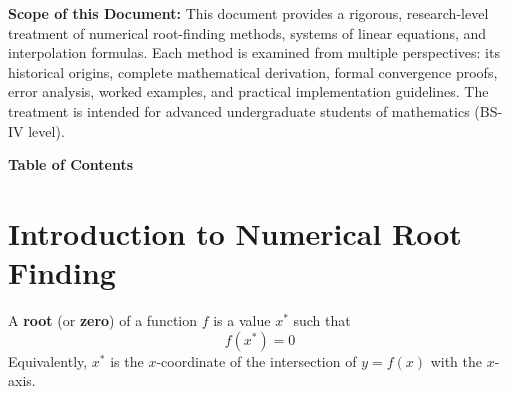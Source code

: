 \documentclass[12pt]{article}
\begin{document}
\vspace{10pt}

\begin{tcolorbox}[colback=purplebg!60, colframe=purpleclr, arc=4pt, boxrule=1pt,
  left=12pt, right=12pt, top=8pt, bottom=8pt,
  borderline west={4pt}{0pt}{purpleclr}]
\textbf{\color{purpleclr}Scope of this Document:} This document provides a rigorous, research-level treatment of numerical root-finding methods, systems of linear equations, and interpolation formulas. Each method is examined from multiple perspectives: its historical origins, complete mathematical derivation, formal convergence proofs, error analysis, worked examples, and practical implementation guidelines. The treatment is intended for advanced undergraduate students of mathematics (BS-IV level).
\end{tcolorbox}

\newpage

\thispagestyle{fancy}

\begin{tcolorbox}[
  enhanced, arc=0pt, boxrule=0pt,
  colback=primary, colframe=primary,
  left=20pt, right=20pt, top=22pt, bottom=18pt,
  borderline south={5pt}{0pt}{accent},
]
  \centering
  {\fontsize{22}{28}\bfseries\color{white} Table of Contents}
\end{tcolorbox}

\vspace{10pt}
\tableofcontents

\newpage

\section*{Introduction to Numerical Root Finding}

\begin{defbox}
A \textbf{root} (or \textbf{zero}) of a function $f$ is a value $x^*$ such that
\[
  f(x^*) = 0
\]
Equivalently, $x^*$ is the $x$-coordinate of the intersection of $y = f(x)$ with the $x$-axis.
\end{defbox}
\end{document}
